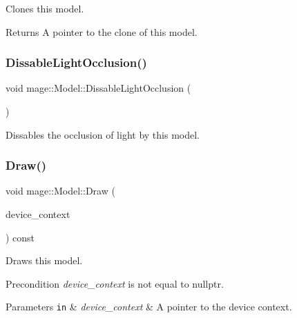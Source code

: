 Clones this model.

\begin{DoxyReturn}{Returns}
A pointer to the clone of this model. 
\end{DoxyReturn}
\hypertarget{classmage_1_1_model_a7e21b77f1f0afa83fef7a0398d6a9411}{}\label{classmage_1_1_model_a7e21b77f1f0afa83fef7a0398d6a9411} 
\subsubsection{\texorpdfstring{Dissable\+Light\+Occlusion()}{DissableLightOcclusion()}}
{\footnotesize\ttfamily void mage\+::\+Model\+::\+Dissable\+Light\+Occlusion (\begin{DoxyParamCaption}{ }\end{DoxyParamCaption})\hspace{0.3cm}{\ttfamily [noexcept]}}

Dissables the occlusion of light by this model. \hypertarget{classmage_1_1_model_aa0358375a2906b24ce4f3e0ddc4cdd01}{}\label{classmage_1_1_model_aa0358375a2906b24ce4f3e0ddc4cdd01} 
\subsubsection{\texorpdfstring{Draw()}{Draw()}}
{\footnotesize\ttfamily void mage\+::\+Model\+::\+Draw (\begin{DoxyParamCaption}\item[{I\+D3\+D11\+Device\+Context4 $\ast$}]{device\+\_\+context }\end{DoxyParamCaption}) const\hspace{0.3cm}{\ttfamily [noexcept]}}

Draws this model.

\begin{DoxyPrecond}{Precondition}
{\itshape device\+\_\+context} is not equal to {\ttfamily nullptr}. 
\end{DoxyPrecond}

\begin{DoxyParams}[1]{Parameters}
\mbox{\tt in}  & {\em device\+\_\+context} & A pointer to the device context. \\
\hline
\end{DoxyParams}
\hypertarget{classmage_1_1_model_a5fd5e62a3365810d84af4cf9c202a9fa}{}\label{classmage_1_1_model_a5fd5e62a3365810d84af4cf9c202a9fa} 
